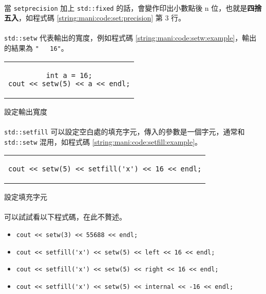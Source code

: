 \documentclass[12pt,a4paper,oneside]{report}
\begin{document}
\begin{CJK}{UTF8}{bkai}
\paragraph{}當 \lstinline!setprecision! 加上 \lstinline!std::fixed! 的話，會變作印出小數點後 n 位，也就是\textbf{四捨五入}，如程式碼 \ref{string:mani:code:set:precision} 第 3 行。
\paragraph{}\lstinline!std::setw! 代表輸出的寬度，例如程式碼 \ref{string:mani:code:setw:example}，輸出的結果為 \lstinline!"   16"!。

\begin{code}[h!]
  \centering
  \begin{tabular}{c}
  \begin{lstlisting}
int a = 16;
cout << setw(5) << a << endl;
  \end{lstlisting}
  \end{tabular}
  \caption{設定輸出寬度}
  \label{string:mani:code:setw:example}
\end{code}

\paragraph{}\lstinline!std::setfill! 可以設定空白處的填充字元，傳入的參數是一個字元，通常和 \lstinline!std::setw! 混用，如程式碼 \ref{string:mani:code:setfill:example}。

\begin{code}[h!]
  \centering
  \begin{tabular}{c}
  \begin{lstlisting}
cout << setw(5) << setfill('x') << 16 << endl;
  \end{lstlisting}
  \end{tabular}
  \caption{設定填充字元}
  \label{string:mani:code:setfill:example}
\end{code}

\paragraph{}可以試試看以下程式碼，在此不贅述。
\begin{itemize}
\item \lstinline!cout << setw(3) << 55688 << endl;!
\item \lstinline!cout << setfill('x') << setw(5) << left << 16 << endl;!
\item \lstinline!cout << setfill('x') << setw(5) << right << 16 << endl;!
\item \lstinline!cout << setfill('x') << setw(5) << internal << -16 << endl;!
\end{itemize}


\end{CJK}
\end{document}
